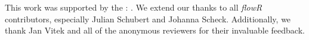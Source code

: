 \begin{acks}
   This work was supported by the : \textit{}. We extend our thanks to all \textit{flowR} contributors, especially Julian Schubert and Johanna Scheck. Additionally, we thank Jan Vitek and all of the anonymous reviewers for their invaluable feedback.
\end{acks}
